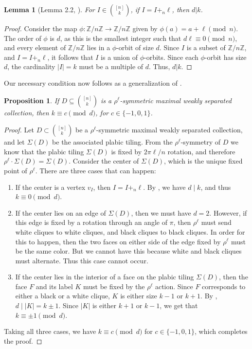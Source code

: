\documentclass[11pt]{amsart}
\newcommand{\Z}{\mathbb{Z}}
\theoremstyle{plain}
\newtheorem{lemma}[theorem]{Lemma}
\newtheorem{proposition}[theorem]{Proposition}
\theoremstyle{definition}
\begin{document}
\begin{lemma}[Lemma 2.2, \cite{PasqTZ2019}] \label{lemma: PTZ lemma 2.2}
    For $I\in {[n]\choose k}$, if $I=I+_n \ell$, then $d|k$. 
\end{lemma}
\begin{proof}
    Consider the map $\phi: \Z / n\Z \rightarrow \Z / n\Z $ given by $\phi(a)= a + \ell \pmod n$. The order of $\phi$ is $d$, as this is the smallest integer such that $d \ell \equiv 0 \pmod{n}$, and every element of $\Z / n\Z$ lies in a $\phi$-orbit of size $d$. Since $I$ is a subset of $\Z / n\Z$, and $I = I +_n \ell$, it follows that $I$ is a union of $\phi$-orbits. Since each $\phi$-orbit has size $d$, the cardinality $|I| = k$ must be a multiple of $d$. Thus, $d|k$.
\end{proof}



Our necessary condition now follows as a generalization of \cite[Proposition 2.1]{PasqTZ2019}.

\begin{proposition}\label{prop: necessary}
If $D\subseteq {[n]\choose k}$ is a $\rho^\ell$-symmetric maximal weakly separated collection, then $k \equiv c \pmod {d}$, for $c\in\{-1, 0, 1\}$.
\end{proposition} 
\begin{proof}

Let $D\subset \binom{[n]}{k}$ be a $\rho^\ell$-symmetric maximal weakly separated collection, and let  $\Sigma(D)$ be the associated plabic tiling. From the $\rho^\ell$-symmetry of $D$ we know that the plabic tiling $\Sigma(D)$ is fixed by $2\pi\ell/n$ rotation, and therefore $\rho^\ell\cdot \Sigma(D)= \Sigma(D)$. Consider the center of $\Sigma(D)$, which is the unique fixed point of $\rho^\ell$. There are three cases that can happen:

\begin{enumerate}
    \item If the center is a vertex $v_I$, then $I=I+_n \ell$. By , we have $d \mid k $, and thus $k \equiv 0 \pmod{d}$.
    \item If the center lies on an edge of $\Sigma(D)$, then we must have $d=2$. However, if this edge is fixed by a rotation through an angle of $\pi$, then $\rho^\ell$ must send white cliques to white cliques, and black cliques to black cliques. In order for this to happen, then the two faces on either side of the edge fixed by $\rho^\ell$ must be the same color. But we cannot have this because white and black cliques must alternate. Thus this case cannot occur. 
    \item If the center lies in the interior of a face on the plabic tiling $\Sigma(D)$, then the face $F$ and its label $K$ must be fixed by the $\rho^\ell$ action. Since $F$ corresponds to either a black or a white clique, $K$ is either size $k-1$ or $k+1$. 
    By , $d \mid |K|=k\pm 1$. Since $|K|$ is either $k+1$ or $k-1$, we get 
    that $k \equiv \pm1 \pmod{d}$.
\end{enumerate}

Taking all three cases, we have $k \equiv c\pmod{d}$ for $c \in \{-1,0,1\}$, which completes the proof.
\end{proof}
\end{document}
